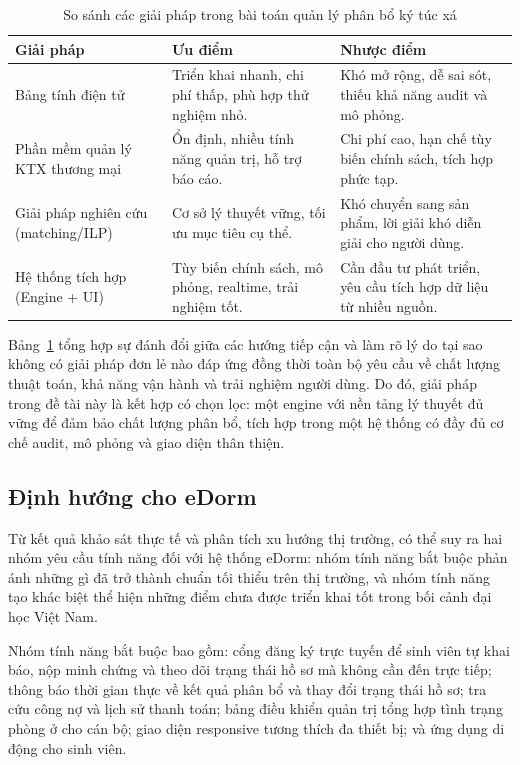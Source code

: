 \documentclass[../DoAn.tex]{subfiles}
\begin{document}
{
\begin{table}[htbp]
\centering
\caption{So sánh các giải pháp trong bài toán quản lý phân bổ ký túc xá}
\label{tab:comparison}
\renewcommand{\arraystretch}{1.5}
\begin{tabular}{p{4.0cm} p{4.8cm} p{4.8cm}}
\toprule
\textbf{Giải pháp} & \textbf{Ưu điểm} & \textbf{Nhược điểm} \\
\midrule
Bảng tính điện tử
  & Triển khai nhanh, chi phí thấp, phù hợp thử nghiệm nhỏ.
  & Khó mở rộng, dễ sai sót, thiếu khả năng audit và mô phỏng. \\
Phần mềm quản lý KTX thương mại
  & Ổn định, nhiều tính năng quản trị, hỗ trợ báo cáo.
  & Chi phí cao, hạn chế tùy biến chính sách, tích hợp phức tạp. \\
Giải pháp nghiên cứu (matching/ILP)
  & Cơ sở lý thuyết vững, tối ưu mục tiêu cụ thể.
  & Khó chuyển sang sản phẩm, lời giải khó diễn giải cho người dùng. \\
Hệ thống tích hợp (Engine + UI)
  & Tùy biến chính sách, mô phỏng, realtime, trải nghiệm tốt.
  & Cần đầu tư phát triển, yêu cầu tích hợp dữ liệu từ nhiều nguồn. \\
\bottomrule
\end{tabular}
\end{table}
}%

Bảng~\ref{tab:comparison} tổng hợp sự đánh đổi giữa các hướng tiếp cận và làm
rõ lý do tại sao không có giải pháp đơn lẻ nào đáp ứng đồng thời toàn bộ yêu
cầu về chất lượng thuật toán, khả năng vận hành và trải nghiệm người dùng. Do
đó, giải pháp trong đề tài này là kết hợp có chọn lọc: một engine với nền tảng
lý thuyết đủ vững để đảm bảo chất lượng phân bổ, tích hợp trong một hệ thống
có đầy đủ cơ chế audit, mô phỏng và giao diện thân thiện.

\subsection{Định hướng cho eDorm}

Từ kết quả khảo sát thực tế và phân tích xu hướng thị trường, có thể suy ra hai
nhóm yêu cầu tính năng đối với hệ thống eDorm: nhóm tính năng bắt buộc phản ánh
những gì đã trở thành chuẩn tối thiểu trên thị trường, và nhóm tính năng tạo
khác biệt thể hiện những điểm chưa được triển khai tốt trong bối cảnh đại học
Việt Nam.

Nhóm tính năng bắt buộc bao gồm: cổng đăng ký trực tuyến để sinh viên tự khai
báo, nộp minh chứng và theo dõi trạng thái hồ sơ mà không cần đến trực tiếp;
thông báo thời gian thực về kết quả phân bổ và thay đổi trạng thái hồ sơ; tra
cứu công nợ và lịch sử thanh toán; bảng điều khiển quản trị tổng hợp tình trạng
phòng ở cho cán bộ; giao diện responsive tương thích đa thiết bị; và ứng dụng
di động cho sinh viên.
\end{document}
